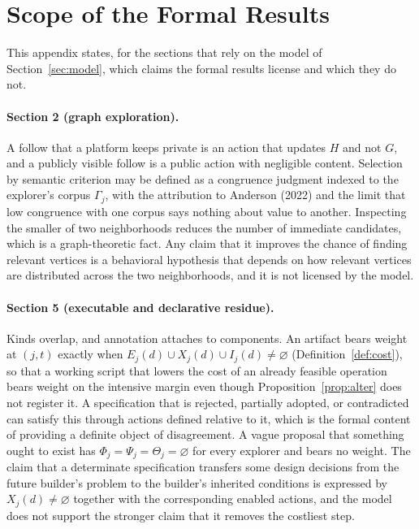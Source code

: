 \documentclass[11pt]{article}
\theoremstyle{definition}
\theoremstyle{remark}
\begin{document}
\appendix
\section{Scope of the Formal Results}\label{app:scope}

This appendix states, for the sections that rely on the model of Section~\ref{sec:model}, which claims the formal results license and which they do not.
\paragraph{Section 2 (graph exploration).} A follow that a platform keeps private is an action that updates $H$ and not $G$, and a publicly visible follow is a public action with negligible content. Selection by semantic criterion may be defined as a congruence judgment indexed to the explorer's corpus $\Gamma_j$, with the attribution to Anderson (2022) and the limit that low congruence with one corpus says nothing about value to another. Inspecting the smaller of two neighborhoods reduces the number of immediate candidates, which is a graph-theoretic fact. Any claim that it improves the chance of finding relevant vertices is a behavioral hypothesis that depends on how relevant vertices are distributed across the two neighborhoods, and it is not licensed by the model.

\paragraph{Section 5 (executable and declarative residue).} Kinds overlap, and annotation attaches to components. An artifact bears weight at $(j,t)$ exactly when $E_j(d)\cup X_j(d)\cup I_j(d)\neq\varnothing$ (Definition~\ref{def:cost}), so that a working script that lowers the cost of an already feasible operation bears weight on the intensive margin even though Proposition~\ref{prop:alter} does not register it. A specification that is rejected, partially adopted, or contradicted can satisfy this through actions defined relative to it, which is the formal content of providing a definite object of disagreement. A vague proposal that something ought to exist has $\Phi_j=\Psi_j=\Theta_j=\varnothing$ for every explorer and bears no weight. The claim that a determinate specification transfers some design decisions from the future builder's problem to the builder's inherited conditions is expressed by $X_j(d)\neq\varnothing$ together with the corresponding enabled actions, and the model does not support the stronger claim that it removes the costliest step.
\end{document}
